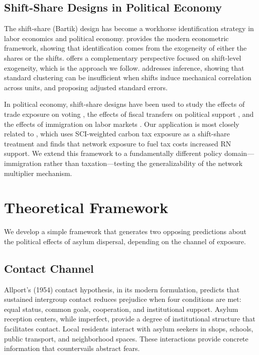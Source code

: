 \documentclass[12pt]{article}
\begin{document}
\subsection{Shift-Share Designs in Political Economy}

The shift-share (Bartik) design has become a workhorse identification strategy in labor economics and political economy. \citet{goldsmith2020bartik} provides the modern econometric framework, showing that identification comes from the exogeneity of either the shares or the shifts. \citet{borusyak2022quasi} offers a complementary perspective focused on shift-level exogeneity, which is the approach we follow. \citet{adao2019shift} addresses inference, showing that standard clustering can be insufficient when shifts induce mechanical correlation across units, and proposing adjusted standard errors.

In political economy, shift-share designs have been used to study the effects of trade exposure on voting \citep{autor2020importing}, the effects of fiscal transfers on political support \citep{fetzer2019did}, and the effects of immigration on labor markets \citep{peri2016economic}. Our application is most closely related to \citet{apep0464connected}, which uses SCI-weighted carbon tax exposure as a shift-share treatment and finds that network exposure to fuel tax costs increased RN support. We extend this framework to a fundamentally different policy domain---immigration rather than taxation---testing the generalizability of the network multiplier mechanism.

\section{Theoretical Framework}
\label{sec:theory}

We develop a simple framework that generates two opposing predictions about the political effects of asylum dispersal, depending on the channel of exposure.

\subsection{Contact Channel}

Allport's (1954) contact hypothesis, in its modern formulation, predicts that sustained intergroup contact reduces prejudice when four conditions are met: equal status, common goals, cooperation, and institutional support. Asylum reception centers, while imperfect, provide a degree of institutional structure that facilitates contact. Local residents interact with asylum seekers in shops, schools, public transport, and neighborhood spaces. These interactions provide concrete information that countervails abstract fears.
\end{document}
